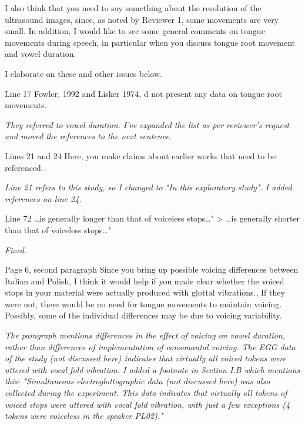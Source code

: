 \documentclass[]{article}
\begin{document}
I also think that you need to say something about the resolution of the
ultrasound images, since, as noted by Reviewer 1, some movements are
very small. In addition, I would like to see some general comments on
tongue movements during speech, in particular when you discuss tongue
root movement and vowel duration.

I elaborate on these and other issues below.

Line 17 Fowler, 1992 and Lisker 1974, d not present any data on tongue
root movements.

\begin{adjustwidth}{1cm}{} \textit{
They referred to vowel duration. I've expanded the list as per reviewer's request and moved the references to the next sentence.
} \end{adjustwidth}

Lines 21 and 24 Here, you make claims about earlier works that need to
be referenced.

\begin{adjustwidth}{1cm}{} \textit{
Line 21 refers to this study, so I changed to "In this exploratory study". I added references on line 24.
} \end{adjustwidth}

Line 72 \ldots{}is generally longer than that of voiceless
stops\ldots{}" \textgreater{} \ldots{}is generally shorter than that of
voiceless stops\ldots{}"

\begin{adjustwidth}{1cm}{} \textit{
Fixed.
} \end{adjustwidth}

Page 6, second paragraph Since you bring up possible voicing differences
between Italian and Polish, I think it would help if you made clear
whether the voiced stops in your material were actually produced with
glottal vibrations., If they were not, there would be no need for tongue
movements to maintain voicing. Possibly, some of the individual
differences may be due to voicing variability.

\begin{adjustwidth}{1cm}{} \textit{
The paragraph mentions differences in the effect of voicing on vowel duration, rather than differences of implementation of consonantal voicing. The EGG data of the study (not discussed here) indicates that virtually all voiced tokens were uttered with vocal fold vibration. I added a footnote in Section I.B which mentions this: "Simultaneous electroglottographic data (not discussed here) was also collected during the experiment. This data indicates that virtually all tokens of voiced stops were uttered with vocal fold vibration, with just a few exceptions (4 tokens were voiceless in the speaker PL02)."
} \end{adjustwidth}
\end{document}
